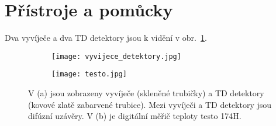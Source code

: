 \section{Přístroje a pomůcky}
Dva vyvíječe a dva TD detektory jsou k vidění v obr.~\ref{fig:prutoky_vyvijece_detektory}.
\begin{figure}[ht]
    \centering
    \begin{subfigure}[b]{0.4\textwidth}
        \centering
        \texttt{[image: vyvijece\_detektory.jpg]}
        \caption{}
        \label{fig:prutoky_vyvijece_detektory}
    \end{subfigure}
    \begin{subfigure}[b]{0.35\textwidth}
        \centering
        \texttt{[image: testo.jpg]}
        \caption{}
        \label{fig:prutoky_testo}
    \end{subfigure}
    \caption{V (a) jsou zobrazeny vyvíječe (skleněné trubičky) a TD detektory (kovové zlatě zabarvené trubice). Mezi vyvíječi a TD detektory jsou difúzní uzávěry. V (b) je digitální měřič teploty testo 174H.}
\end{figure}
